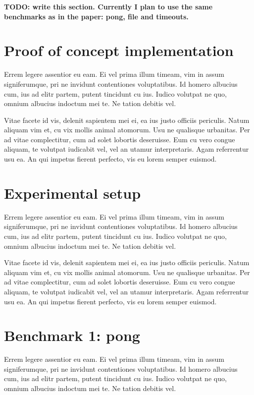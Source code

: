 \documentclass[a4paper,11pt,oneside]{report}
\begin{document}
\textbf{TODO: write this section. Currently I plan to use the same benchmarks as
  in the \cite{bib:o'sullivan} paper: pong, file and timeouts.}

\section{Proof of concept implementation}

Errem legere assentior eu eam. Ei vel prima illum timeam, vim in assum
signiferumque, pri ne invidunt contentiones voluptatibus. Id homero albucius
cum, ius ad elitr partem, putent tincidunt cu ius. Iudico volutpat ne quo,
omnium albucius indoctum mei te. Ne tation debitis vel.

Vitae facete id vis, delenit sapientem mei ei, ea ius justo officiis
periculis. Natum aliquam vim et, cu vix mollis animal atomorum. Usu ne qualisque
urbanitas. Per ad vitae complectitur, cum ad solet lobortis deseruisse. Eum cu
vero congue aliquam, te volutpat iudicabit vel, vel an utamur
interpretaris. Agam referrentur usu ea. An qui impetus fierent perfecto, vis eu
lorem semper euismod.

\section{Experimental setup}

Errem legere assentior eu eam. Ei vel prima illum timeam, vim in assum
signiferumque, pri ne invidunt contentiones voluptatibus. Id homero albucius
cum, ius ad elitr partem, putent tincidunt cu ius. Iudico volutpat ne quo,
omnium albucius indoctum mei te. Ne tation debitis vel.

Vitae facete id vis, delenit sapientem mei ei, ea ius justo officiis
periculis. Natum aliquam vim et, cu vix mollis animal atomorum. Usu ne qualisque
urbanitas. Per ad vitae complectitur, cum ad solet lobortis deseruisse. Eum cu
vero congue aliquam, te volutpat iudicabit vel, vel an utamur
interpretaris. Agam referrentur usu ea. An qui impetus fierent perfecto, vis eu
lorem semper euismod.

\section{Benchmark 1: pong}

Errem legere assentior eu eam. Ei vel prima illum timeam, vim in assum
signiferumque, pri ne invidunt contentiones voluptatibus. Id homero albucius
cum, ius ad elitr partem, putent tincidunt cu ius. Iudico volutpat ne quo,
omnium albucius indoctum mei te. Ne tation debitis vel.
\end{document}
